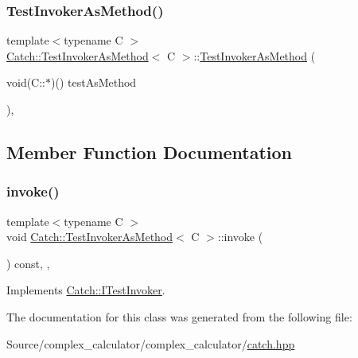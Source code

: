 \subsubsection{\texorpdfstring{Test\+Invoker\+As\+Method()}{TestInvokerAsMethod()}}
{\footnotesize\ttfamily template$<$typename C $>$ \\
\mbox{\hyperlink{class_catch_1_1_test_invoker_as_method}{Catch\+::\+Test\+Invoker\+As\+Method}}$<$ C $>$\+::\mbox{\hyperlink{class_catch_1_1_test_invoker_as_method}{Test\+Invoker\+As\+Method}} (\begin{DoxyParamCaption}\item[{void(C\+::$\ast$)()}]{test\+As\+Method }\end{DoxyParamCaption})\hspace{0.3cm}{\ttfamily [inline]}, {\ttfamily [noexcept]}}



\subsection{Member Function Documentation}
\mbox{\label{class_catch_1_1_test_invoker_as_method_a8115a06efe273f4112ec0b5452c1b5f2}} 
\subsubsection{\texorpdfstring{invoke()}{invoke()}}
{\footnotesize\ttfamily template$<$typename C $>$ \\
void \mbox{\hyperlink{class_catch_1_1_test_invoker_as_method}{Catch\+::\+Test\+Invoker\+As\+Method}}$<$ C $>$\+::invoke (\begin{DoxyParamCaption}{ }\end{DoxyParamCaption}) const\hspace{0.3cm}{\ttfamily [inline]}, {\ttfamily [override]}, {\ttfamily [virtual]}}



Implements \mbox{\hyperlink{struct_catch_1_1_i_test_invoker_a6fcd5c5b67d6d5ade6491ff33411ca7f}{Catch\+::\+I\+Test\+Invoker}}.



The documentation for this class was generated from the following file\+:\begin{DoxyCompactItemize}
\item 
Source/complex\+\_\+calculator/complex\+\_\+calculator/\mbox{\hyperlink{catch_8hpp}{catch.\+hpp}}\end{DoxyCompactItemize}
